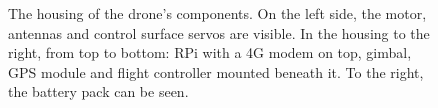 \documentclass[nofilelist]{cslthse-msc}
\begin{document}
\begin{figure}[!hbt]
   \centering
   \caption{The housing of the drone's components. On the left side, the motor, antennas and control surface servos are visible. In the housing to the right, from top to bottom: RPi with a 4G modem on top, gimbal, GPS module and flight controller mounted beneath it. To the right, the battery pack can be seen.}
   \label{fig:drone-internals}
\end{figure}
\end{document}
